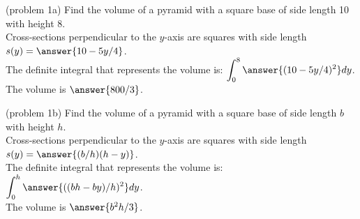 \documentclass[handout]{ximera}
\begin{document}
 
 
\begin{problem}(problem 1a) Find the volume of a pyramid with a square base of side length 10 with height 8.\\
Cross-sections perpendicular to the $y$-axis are squares with side length $s(y) = \answer{10 - 5y/4}$.\\
The definite integral that represents the volume is: $\displaystyle{\int_0^8 \answer{(10 - 5y/4)^2} dy}$.\\
The volume is $\answer{800/3}$.
\end{problem}


\begin{problem}(problem 1b) Find the volume of a pyramid with a square base of side length $b$ with height $h$.\\
Cross-sections perpendicular to the $y$-axis are squares with side length $s(y) = \answer{ (b/h)(h-y)}$.\\
The definite integral that represents the volume is: $\displaystyle{\int_0^h \answer{((bh-by)/h)^2} dy}$.\\
The volume is $\answer{b^2h/3}$.
\end{problem}
\end{document}
